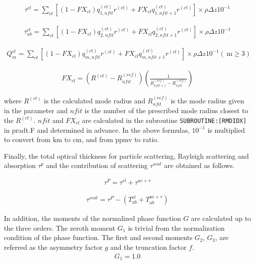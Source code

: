 \begin{eqnarray}
\tau^{c l}=\sum_{c t}\left[\left(1-F X_{c l}\right) q_{1, n f i t}^{(c t)} r^{(c t)}+F X_{c l} q_{1, n f i t+1}^{(c t)} r^{(c t)}\right] \times \rho \Delta z 10^{-1}
\end{eqnarray}

\begin{eqnarray}
\tau_{ab}^{c l}=\sum_{c t}\left[\left(1-F X_{c l}\right) q_{2, n f i t}^{(c t)} r^{(c t)}+F X_{c l} q_{2, n f i t+1}^{(c t)} r^{(c t)}\right] \times \rho \Delta z 10^{-1}
\end{eqnarray}

\begin{eqnarray}
Q_{m}^{c l}=\sum_{c t}\left[\left(1-F X_{c l}\right) q_{m, n f i t}^{(c t)} r^{(c t)}+F X_{c l} q_{m, n f i t+1}^{(c t)} r^{(c t)}\right] \times \rho \Delta z 10^{-1}(\mathrm{~m} \geq 3)
\end{eqnarray}

\begin{eqnarray}
F X_{c l}=\left(R^{(c t)}-R_{n f i t}^{(r e f)}\right)\left(\frac{1}{R_{n f i t+1}^{(r e f)}-R_{n f i t}^{(r e f)}}\right)
\end{eqnarray}

where \(R^{(ct)}\) is the calculated mode radius and
\(R_{n f i t}^{(r e f)}\) is the mode radius given in the parameter and
\(nfit\) is the number of the prescribed mode radius closest to the
\(R^{(ct)}\). \(nfit\) and \(FX_{cl}\) are calculated in the subroutine
\texttt{SUBROUTINE:{[}RMDIDX{]}} in pradt.F and determined in advance.
In the above formulas, \(10^{-1}\) is multiplied to convert from
\(\mathrm{km}\) to \(\mathrm{cm}\), and from ppmv to ratio.

Finally, the total optical thickness for particle scattering, Rayleigh
scattering and absorption \(\tau^p\) and the contribution of scattering
\(\tau^{scat}\) are obtained as follows.

\begin{eqnarray}
\tau^{P}=\tau^{c l}+\tau^{a e+r}
\end{eqnarray}

\begin{eqnarray}
\tau^{s c a t}=\tau^{P}-\left(T_{ab}^{c l}+T_{ab}^{a e+r}\right)
\end{eqnarray}

In addition, the moments of the normalized phase function \(G\) are
calculated up to the three orders. The zeroth moment \(G_1\) is trivial
from the normalization condition of the phase function. The first and
second moments \(G_2\), \(G_3\), are referred as the asymmetry factor
\(g\) and the truncation factor \(f\). \begin{eqnarray}
G_{1}=1.0
\end{eqnarray}

